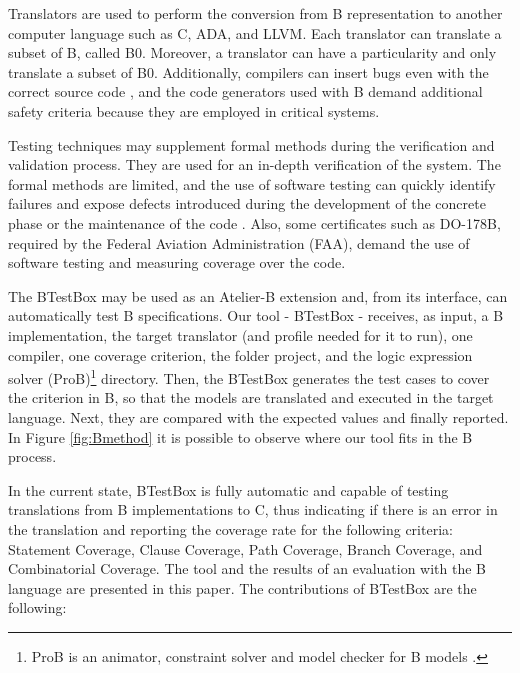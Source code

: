 \documentclass[runningheads]{llncs}
\begin{document}
Translators are used to perform the conversion from B representation to another computer language such as C, ADA, and LLVM. Each translator can translate a subset of B, called B0. Moreover, a translator can have a particularity and only translate a subset of B0. %
Additionally, compilers can insert bugs even with the correct source code \cite{leroy2009formal}, and the code generators used with B demand additional safety criteria because they are employed in critical systems.

Testing techniques may supplement formal methods during the verification and validation process. They are used for an in-depth verification of the system. The formal methods are limited, and the use of software testing can quickly identify failures and expose defects introduced during the development of the concrete phase or the maintenance of the code \cite{ernesto_thesis:2016}. Also, some certificates such as DO-178B, required by the Federal Aviation Administration (FAA), demand the use of software testing and measuring coverage over the code.

The BTestBox may be used as an Atelier-B extension and, from its interface, can automatically test B specifications. Our tool - BTestBox - receives, as input, a B implementation, the target translator (and profile needed for it to run), one compiler, one coverage criterion, the folder project, and the logic expression solver (ProB)\footnote{ProB is an animator, constraint solver and model checker for B models \cite{1_leuschel_2017}.} directory. Then, the BTestBox generates the test cases to cover the criterion in B, so that the models are translated and executed in the target language. Next, they are compared with the expected values and finally reported. In Figure \ref{fig:Bmethod} it is possible to observe where our tool fits in the B process.

In the current state, BTestBox is fully automatic and capable of testing translations from B implementations to C, thus indicating if there is an error in the translation and reporting the coverage rate for the following criteria: Statement Coverage, Clause Coverage, Path Coverage, Branch Coverage, and Combinatorial Coverage. 
The tool and the results of an evaluation with the B language are presented in this paper. The contributions of BTestBox are the following:
\end{document}
